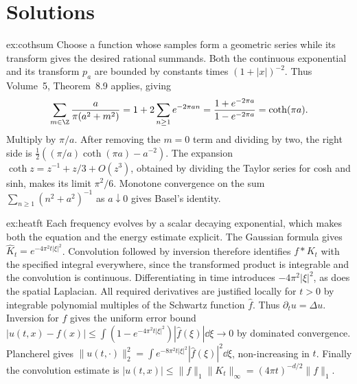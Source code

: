 \section{Solutions}

\begin{solution}{ex:cothsum}
\idea Choose a function whose samples form a geometric series while its transform gives the desired rational summands.
\writeup Both the continuous exponential and its transform $p_a$ are bounded by constants times $(1+|x|)^{-2}$. Thus Volume~5, Theorem~8.9 applies, giving
\[
\sum_{m\in\Z}\frac a{\pi(a^2+m^2)}
=1+2\sum_{n\ge1}e^{-2\pi an}
=\frac{1+e^{-2\pi a}}{1-e^{-2\pi a}}=\coth(\pi a).
\]
Multiply by $\pi/a$. After removing the $m=0$ term and dividing by two, the right side is
$\tfrac12((\pi/a)\coth(\pi a)-a^{-2})$.
The expansion $\coth z=z^{-1}+z/3+O(z^3)$, obtained by dividing the Taylor series for cosh and sinh, makes its limit $\pi^2/6$. Monotone convergence on the sum $\sum_{n\ge1}(n^2+a^2)^{-1}$ as $a\downarrow0$ gives Basel's identity.
\end{solution}

\begin{solution}{ex:heatft}
\idea Each frequency evolves by a scalar decaying exponential, which makes both the equation and the energy estimate explicit.
\writeup The Gaussian formula gives $\hat K_t=e^{-4\pi^2t|\xi|^2}$. Convolution followed by inversion therefore identifies $f*K_t$ with the specified integral everywhere, since the transformed product is integrable and the convolution is continuous.
Differentiating in time introduces $-4\pi^2|\xi|^2$, as does the spatial Laplacian. All required derivatives are justified locally for $t>0$ by integrable polynomial multiples of the Schwartz function $\hat f$. Thus $\partial_tu=\Delta u$. Inversion for $f$ gives the uniform error bound
$|u(t,x)-f(x)|\le\int(1-e^{-4\pi^2t|\xi|^2})|\hat f(\xi)|\dd\xi\to0$
by dominated convergence.
Plancherel gives $\|u(t,\cdot)\|_2^2=\int e^{-8\pi^2t|\xi|^2}|\hat f(\xi)|^2\dd\xi$, non-increasing in $t$. Finally the convolution estimate is $|u(t,x)|\le\|f\|_1\|K_t\|_\infty=(4\pi t)^{-d/2}\|f\|_1$.
\end{solution}

